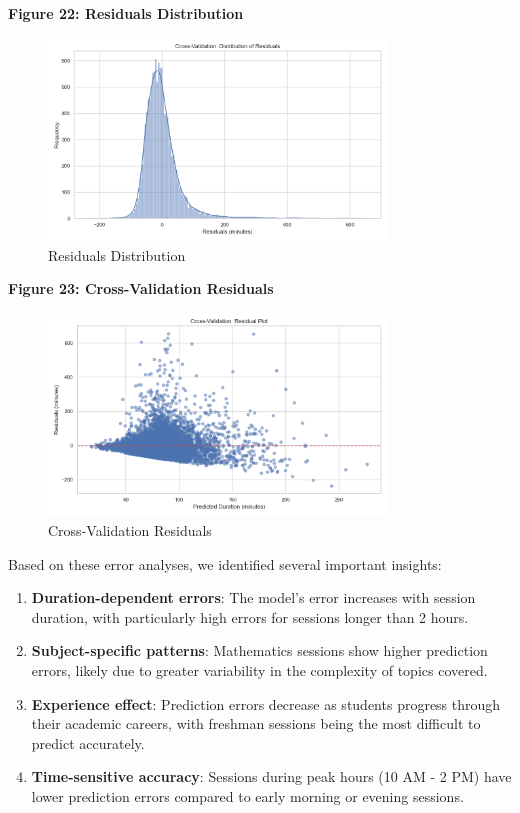 \documentclass[12pt,letterpaper]{article}
\begin{document}
\textbf{Figure 22: Residuals Distribution}

\begin{figure}[H]
    \centering
    \includegraphics[width=0.8\textwidth]{duration_prediction/visualizations/cv_residuals_distribution.png}
    \caption{Residuals Distribution}
\end{figure}

\textbf{Figure 23: Cross-Validation Residuals}

\begin{figure}[H]
    \centering
    \includegraphics[width=0.8\textwidth]{duration_prediction/visualizations/cv_residuals.png}
    \caption{Cross-Validation Residuals}
\end{figure}

Based on these error analyses, we identified several important insights:

\begin{enumerate}
    \item \textbf{Duration-dependent errors}: The model's error increases with session duration, with particularly high errors for sessions longer than 2 hours.

    \item \textbf{Subject-specific patterns}: Mathematics sessions show higher prediction errors, likely due to greater variability in the complexity of topics covered.

    \item \textbf{Experience effect}: Prediction errors decrease as students progress through their academic careers, with freshman sessions being the most difficult to predict accurately.

    \item \textbf{Time-sensitive accuracy}: Sessions during peak hours (10 AM - 2 PM) have lower prediction errors compared to early morning or evening sessions.
\end{enumerate}
\end{document}
